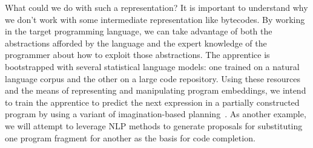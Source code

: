 What could we do with such a representation? It is important to understand why we don't work with some intermediate representation like bytecodes. By working in the target programming language, we can take advantage of both the abstractions afforded by the language and the expert knowledge of the programmer about how to exploit those abstractions. The apprentice is bootstrapped with several statistical language models: one trained on a natural language corpus and the other on a large code repository. Using these resources and the means of representing and manipulating program embeddings, we intend to train the apprentice to predict the next expression in a partially constructed program by using a variant of imagination-based planning~\cite{PascanuetalCoRR-17}. As another example, we will attempt to leverage NLP methods to generate proposals for substituting one program fragment for another as the basis for code completion. 


